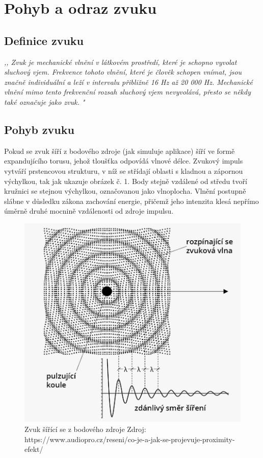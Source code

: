 \section{Pohyb a odraz zvuku}

\subsection{Definice zvuku}
\textit{,, Zvuk je mechanické vlnění v látkovém prostředí, které je schopno vyvolat sluchový vjem. Frekvence tohoto vlnění, které je člověk schopen vnímat, jsou značně individuální a leží v intervalu přibližně 16 Hz až 20 000 Hz. Mechanické vlnění mimo tento frekvenční rozsah sluchový vjem nevyvolává, přesto se někdy také označuje jako zvuk. "}\cite{ZvukWikipedie}
\\
\subsection{Pohyb zvuku}
Pokud  se zvuk šíří z bodového zdroje (jak simuluje aplikace) šíří ve formě expandujícího torusu, jehož tloušťka odpovídá vlnové délce. Zvukový impuls vytváří prstencovou strukturu, v níž se střídají oblasti s kladnou a zápornou výchylkou, tak jak ukazuje obrázek č. 1. Body stejně vzdálené od středu tvoří kružnici se stejnou výchylkou, označovanou jako vlnoplocha. Vlnění postupně slábne v důsledku zákona zachování energie, přičemž jeho intenzita klesá nepřímo úměrně druhé mocnině vzdálenosti od zdroje impulsu.\cite{papirNaZvuk}
\newpage
\begin{center}
    \begin{figure}
    \centering
    \includegraphics[width=0.5\linewidth]{Obrazky/mic-uni-proximity-fig-2-sound-wave-CZ.jpg}
    \caption{Zvuk šířící se z bodového zdroje\newline
    Zdroj: https://www.audiopro.cz/reseni/co-je-a-jak-se-projevuje-proximity-efekt/}
    \label{fig:enter-label}
\end{figure}
\end{center}



